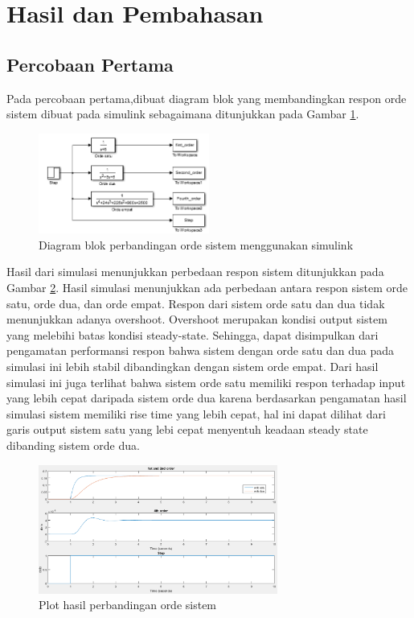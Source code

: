 \documentclass[../laporan]{subfiles}
\begin{document}
\section{Hasil dan Pembahasan}

\subsection{Percobaan Pertama}

Pada percobaan pertama,dibuat diagram blok yang membandingkan respon orde sistem dibuat pada simulink sebagaimana ditunjukkan pada Gambar \ref{soal_1_a}.

\begin{figure}[H]
    \centering
    \includegraphics[width = 0.5\textwidth]{figure/soal_1_a.png}
    \caption{Diagram blok perbandingan orde sistem menggunakan simulink}
    \label{soal_1_a}
\end{figure}

Hasil dari simulasi menunjukkan perbedaan respon sistem ditunjukkan pada Gambar \ref{hasil_1_a}. Hasil simulasi menunjukkan ada perbedaan antara respon sistem orde satu, orde dua, dan orde empat. Respon dari sistem orde satu dan dua tidak menunjukkan adanya overshoot. Overshoot merupakan kondisi output sistem yang melebihi batas kondisi steady-state. Sehingga, dapat disimpulkan dari pengamatan performansi respon bahwa sistem dengan orde satu dan dua pada simulasi ini lebih stabil dibandingkan dengan sistem orde empat. Dari hasil simulasi ini juga terlihat bahwa sistem orde satu memiliki respon terhadap input yang lebih cepat daripada sistem orde dua karena berdasarkan pengamatan hasil simulasi sistem memiliki rise time yang lebih cepat, hal ini dapat dilihat dari garis output sistem satu yang lebi cepat menyentuh keadaan steady state dibanding sistem orde dua.

\begin{figure}[H]
    \centering
    \includegraphics[width = 0.7\textwidth]{figure/hasil_1_a.png}
    \caption{Plot hasil perbandingan orde sistem}
    \label{hasil_1_a}
\end{figure}
\end{document}
